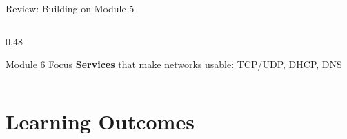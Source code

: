 \documentclass[aspectratio=169]{beamer}  %
\begin{document}
\begin{frame}{Review: Building on Module 5}
\begin{columns}[T]
\begin{column}{0.48\textwidth}
\begin{center}
\end{center}
            
            \begin{exampleblock}{Module 6 Focus}
                \small
                \textbf{Services} that make networks usable: TCP/UDP, DHCP, DNS
            \end{exampleblock}
        \end{column}
    \end{columns}
\end{frame}

\section*{Learning Outcomes}
\end{document}
